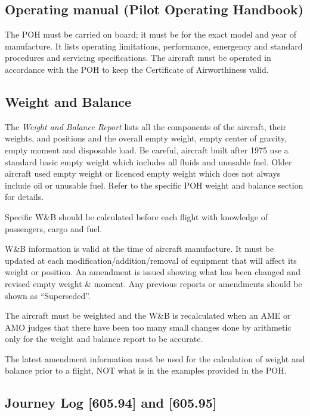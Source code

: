 \documentclass[12pt,letterpaper]{article}
\begin{document}
    \subsection{Operating manual (Pilot Operating Handbook)}
    
    The POH must be carried on board; it must be for the exact model and year of manufacture. It lists operating limitations, performance, emergency and standard procedures and servicing specifications. The aircraft must be operated in accordance with the POH to keep the Certificate of Airworthiness valid. 
    
    \subsection{Weight and Balance}
    
    The \emph{Weight and Balance Report} lists all the components of the aircraft, their weights, and positions and the overall empty weight, empty center of gravity, empty moment and disposable load. Be careful, aircraft built after 1975 use a standard basic empty weight which includes all fluids and unusable fuel. Older aircraft used empty weight or licenced empty weight which does not always include oil or unusable fuel. Refer to the specific POH weight and balance section for details.
    
    Specific W\&B should be calculated before each flight with knowledge of passengers, cargo and fuel.
    
    W\&B information is valid at the time of aircraft manufacture.  It must be updated at each modification/addition/removal of equipment that will affect its weight or position.  An amendment is issued showing what has been changed and revised empty weight \& moment. Any previous reports or amendments should be shown as “Superseded”.
    
    The aircraft must be weighted and the W\&B is recalculated when an AME or AMO judges that there have been too many small changes done by arithmetic only for the weight and balance report to be accurate.
    
    The latest amendment information must be used for the calculation of weight and balance prior to a flight, NOT what is in the examples provided in the POH.
    
    \subsection{Journey Log [605.94] and [605.95]}
    
\end{document}
